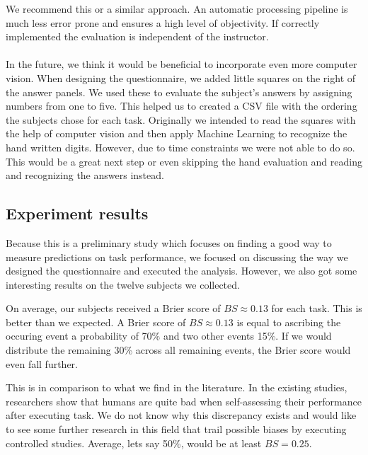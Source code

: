 \documentclass[../main/main.tex]{subfiles}
\begin{document}
	We recommend this or a similar approach. An automatic processing pipeline is much less error prone and ensures a high level of objectivity. If correctly implemented the evaluation is independent of the instructor. 
	\\\\
	In the future, we think it would be beneficial to incorporate even more computer vision. When designing the questionnaire, we added little squares on the right of the answer panels. We used these to evaluate the subject's answers by assigning numbers from one to five. This helped us to created a CSV file with the ordering the subjects chose for each task. Originally we intended to read the squares with the help of computer vision and then apply Machine Learning to recognize the hand written digits. However, due to time constraints we were not able to do so. This would be a great next step or even skipping the hand evaluation and reading and recognizing the answers instead.
	
	\subsection{Experiment results}
	\label{sec:exp_results}
	
	Because this is a preliminary study which focuses on finding a good way to measure predictions on task performance, we focused on discussing the way we designed the questionnaire and executed the analysis. However, we also got some interesting results on the twelve subjects we collected.
	
	On average, our subjects received a Brier score of $BS \approx 0.13$ for each task. This is better than we expected. A Brier score of $BS \approx 0.13$ is equal to ascribing the occuring event a probability of 70\% and two other events 15\%. If we would distribute the remaining 30\% across all remaining events, the Brier score would even fall further. 
	
	This is in comparison to what we find in the literature. In the existing studies, researchers show that humans are quite bad when self-assessing their performance after executing task. We do not know why this discrepancy exists and would like to see some further research in this field that trail possible biases by executing controlled studies. Average, lets say 50\%, would be at least $BS = 0.25$.


	
	
\end{document}
